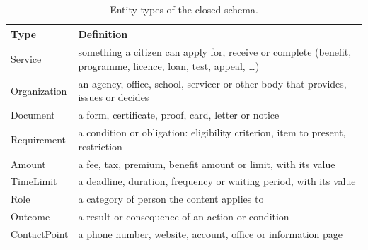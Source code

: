 \begin{table}[ht]
    \centering
    \small
    \caption{Entity types of the closed schema.}
    \label{tab:kg:entities}
    \begin{tabular}{l>{\raggedright\arraybackslash}p{}}
        \toprule
        Type & Definition \\
        \midrule
        Service      & something a citizen can apply for, receive or complete (benefit, programme, licence, loan, test, appeal, \ldots) \\
        Organization & an agency, office, school, servicer or other body that provides, issues or decides \\
        Document     & a form, certificate, proof, card, letter or notice \\
        Requirement  & a condition or obligation: eligibility criterion, item to present, restriction \\
        Amount       & a fee, tax, premium, benefit amount or limit, with its value \\
        TimeLimit    & a deadline, duration, frequency or waiting period, with its value \\
        Role         & a category of person the content applies to \\
        Outcome      & a result or consequence of an action or condition \\
        ContactPoint & a phone number, website, account, office or information page \\
        \bottomrule
    \end{tabular}
\end{table}

